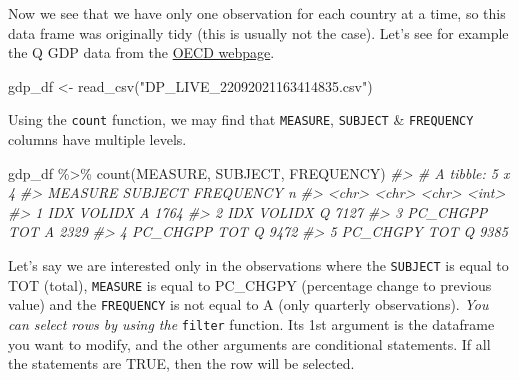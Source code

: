 \documentclass[
]{article}
\newenvironment{Shaded}{\begin{snugshade}}{\end{snugshade}}
\newcommand{\CommentTok}[1]{\textcolor[rgb]{0.56,0.35,0.01}{\textit{#1}}}
\newcommand{\FunctionTok}[1]{\textcolor[rgb]{0.00,0.00,0.00}{#1}}
\newcommand{\NormalTok}[1]{#1}
\newcommand{\OtherTok}[1]{\textcolor[rgb]{0.56,0.35,0.01}{#1}}
\newcommand{\SpecialCharTok}[1]{\textcolor[rgb]{0.00,0.00,0.00}{#1}}
\newcommand{\StringTok}[1]{\textcolor[rgb]{0.31,0.60,0.02}{#1}}
\begin{document}
Now we see that we have only one observation for each country at a time, so this data frame was originally tidy (this is usually not the case). Let's see for example the Q GDP data from the \href{https://data.oecd.org/gdp/quarterly-gdp.htm}{OECD webpage}.

\begin{Shaded}
\begin{Highlighting}[]
\NormalTok{gdp\_df }\OtherTok{\textless{}{-}} \FunctionTok{read\_csv}\NormalTok{(}\StringTok{"DP\_LIVE\_22092021163414835.csv"}\NormalTok{)}
\end{Highlighting}
\end{Shaded}

Using the \texttt{count} function, we may find that \texttt{MEASURE}, \texttt{SUBJECT} \& \texttt{FREQUENCY} columns have multiple levels.

\begin{Shaded}
\begin{Highlighting}[]
\NormalTok{gdp\_df }\SpecialCharTok{\%\textgreater{}\%} 
  \FunctionTok{count}\NormalTok{(MEASURE, SUBJECT, FREQUENCY)}
\CommentTok{\#\textgreater{} \# A tibble: 5 x 4}
\CommentTok{\#\textgreater{}   MEASURE  SUBJECT FREQUENCY     n}
\CommentTok{\#\textgreater{}   \textless{}chr\textgreater{}    \textless{}chr\textgreater{}   \textless{}chr\textgreater{}     \textless{}int\textgreater{}}
\CommentTok{\#\textgreater{} 1 IDX      VOLIDX  A          1764}
\CommentTok{\#\textgreater{} 2 IDX      VOLIDX  Q          7127}
\CommentTok{\#\textgreater{} 3 PC\_CHGPP TOT     A          2329}
\CommentTok{\#\textgreater{} 4 PC\_CHGPP TOT     Q          9472}
\CommentTok{\#\textgreater{} 5 PC\_CHGPY TOT     Q          9385}
\end{Highlighting}
\end{Shaded}

Let's say we are interested only in the observations where the \texttt{SUBJECT} is equal to TOT (total), \texttt{MEASURE} is equal to PC\_CHGPY (percentage change to previous value) and the \texttt{FREQUENCY} is not equal to A (only quarterly observations). \emph{You can select rows by using the} \texttt{filter} function. Its 1st argument is the dataframe you want to modify, and the other arguments are conditional statements. If all the statements are TRUE, then the row will be selected.
\end{document}
